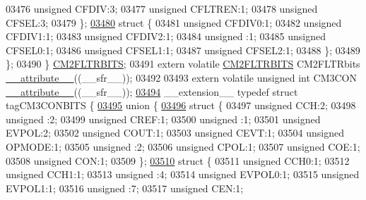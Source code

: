\begin{DoxyCode}
03476       \textcolor{keywordtype}{unsigned} CFDIV:3;
03477       \textcolor{keywordtype}{unsigned} CFLTREN:1;
03478       \textcolor{keywordtype}{unsigned} CFSEL:3;
03479     \};
\hypertarget{a00015_source_l03480}{}\hyperlink{a00015}{03480}     \textcolor{keyword}{struct }\{
03481       \textcolor{keywordtype}{unsigned} CFDIV0:1;
03482       \textcolor{keywordtype}{unsigned} CFDIV1:1;
03483       \textcolor{keywordtype}{unsigned} CFDIV2:1;
03484       \textcolor{keywordtype}{unsigned} :1;
03485       \textcolor{keywordtype}{unsigned} CFSEL0:1;
03486       \textcolor{keywordtype}{unsigned} CFSEL1:1;
03487       \textcolor{keywordtype}{unsigned} CFSEL2:1;
03488     \};
03489   \};
03490 \} \hyperlink{a00014_d2/d41/a00318}{CM2FLTRBITS};
03491 \textcolor{keyword}{extern} \textcolor{keyword}{volatile} \hyperlink{a00014_d2/d41/a00318}{CM2FLTRBITS} CM2FLTRbits \hyperlink{a00015_a493c46f03454991ccc5aa7a6e1dfb2a7}{\_\_attribute\_\_}((\_\_sfr\_\_));
03492 
03493 \textcolor{keyword}{extern} \textcolor{keyword}{volatile} \textcolor{keywordtype}{unsigned} \textcolor{keywordtype}{int}  CM3CON \hyperlink{a00015_a493c46f03454991ccc5aa7a6e1dfb2a7}{\_\_attribute\_\_}((\_\_sfr\_\_));
\hypertarget{a00015_source_l03494}{}\hyperlink{a00015}{03494} \_\_extension\_\_ \textcolor{keyword}{typedef} \textcolor{keyword}{struct }tagCM3CONBITS \{
\hypertarget{a00015_source_l03495}{}\hyperlink{a00015}{03495}   \textcolor{keyword}{union }\{
\hypertarget{a00015_source_l03496}{}\hyperlink{a00015}{03496}     \textcolor{keyword}{struct }\{
03497       \textcolor{keywordtype}{unsigned} CCH:2;
03498       \textcolor{keywordtype}{unsigned} :2;
03499       \textcolor{keywordtype}{unsigned} CREF:1;
03500       \textcolor{keywordtype}{unsigned} :1;
03501       \textcolor{keywordtype}{unsigned} EVPOL:2;
03502       \textcolor{keywordtype}{unsigned} COUT:1;
03503       \textcolor{keywordtype}{unsigned} CEVT:1;
03504       \textcolor{keywordtype}{unsigned} OPMODE:1;
03505       \textcolor{keywordtype}{unsigned} :2;
03506       \textcolor{keywordtype}{unsigned} CPOL:1;
03507       \textcolor{keywordtype}{unsigned} COE:1;
03508       \textcolor{keywordtype}{unsigned} CON:1;
03509     \};
\hypertarget{a00015_source_l03510}{}\hyperlink{a00015}{03510}     \textcolor{keyword}{struct }\{
03511       \textcolor{keywordtype}{unsigned} CCH0:1;
03512       \textcolor{keywordtype}{unsigned} CCH1:1;
03513       \textcolor{keywordtype}{unsigned} :4;
03514       \textcolor{keywordtype}{unsigned} EVPOL0:1;
03515       \textcolor{keywordtype}{unsigned} EVPOL1:1;
03516       \textcolor{keywordtype}{unsigned} :7;
03517       \textcolor{keywordtype}{unsigned} CEN:1;

\end{DoxyCode}
